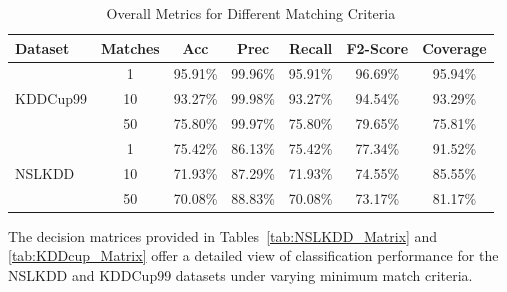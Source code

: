 \documentclass[pdflatex,sn-mathphys-num]{sn-jnl}%
\let\oldcaption\caption
\renewcommand{\caption}[1]{\oldcaption{\centering #1}}
\theoremstyle{thmstyleone}%
\theoremstyle{thmstyletwo}%
\theoremstyle{thmstylethree}%
\begin{document}
\begin{table}[ht!]
  \centering
  \caption{Overall Metrics for Different Matching Criteria}
  \label{tab:Overall_Metrics}
  \begin{tabular}{lcccccc}
    \hline
    \textbf{Dataset}          & \textbf{Matches} & \textbf{Acc} & \textbf{Prec} & \textbf{Recall} & \textbf{F2-Score} & \textbf{Coverage} \\ \hline
    \multirow{3}{*}{KDDCup99} & 1                & 95.91\%      & 99.96\%       & 95.91\%         & 96.69\%           & 95.94\%           \\
                              & 10               & 93.27\%      & 99.98\%       & 93.27\%         & 94.54\%           & 93.29\%           \\
                              & 50               & 75.80\%      & 99.97\%       & 75.80\%         & 79.65\%           & 75.81\%           \\ \hline
    \multirow{3}{*}{NSLKDD}   & 1                & 75.42\%      & 86.13\%       & 75.42\%         & 77.34\%           & 91.52\%           \\
                              & 10               & 71.93\%      & 87.29\%       & 71.93\%         & 74.55\%           & 85.55\%           \\
                              & 50               & 70.08\%      & 88.83\%       & 70.08\%         & 73.17\%           & 81.17\%           \\ \hline
  \end{tabular}
\end{table}


The decision matrices provided in Tables~\ref{tab:NSLKDD_Matrix} and \ref{tab:KDDcup_Matrix} offer a detailed view of classification performance for the NSLKDD and KDDCup99 datasets under varying minimum match criteria.
\end{document}
